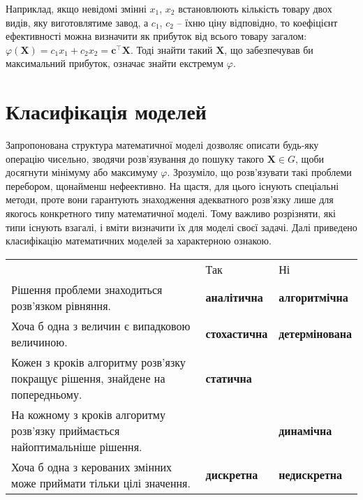 \documentclass[../book.tex]{subfiles}
\begin{document}
Наприклад, якщо невідомі змінні $x_1$, $x_2$ встановлюють кількість товару двох видів, яку виготовлятиме завод, а $c_1$, $c_2$ -- їхню ціну відповідно, то коефіцієнт ефективності можна визначити як прибуток від всього товару загалом: ${\varphi(\mathbf{X})} = {c_1 x_1} + {c_2 x_2} = \mathbf{c}^\top \mathbf{X}$. Тоді знайти такий $\mathbf{X}$, що забезпечував би максимальний прибуток, означає знайти екстремум $\varphi$.

\section{Класифікація моделей}

Запропонована структура математичної моделі дозволяє описати будь-яку операцію чисельно, зводячи розв'язування до пошуку такого ${\mathbf{X} \in G}$, щоби досягнути мінімуму або максимуму $\varphi$. Зрозуміло, що роз\-в'яз\-ува\-ти такі проблеми перебором, щонайменш нефеективно. На щастя, для цього існують спеціальні методи, проте вони гарантують знаходження адекватного розв'язку лише для якогось конкретного типу математичної моделі. Тому важливо розрізняти, які типи існують взагалі, і вміти визначити їх для моделі своєї задачі. Далі приведено класифікацію математичних моделей за характерною ознакою.

\begin{table}[!ht]
\centering
\begin{tabular}{p{5.5cm}|ll}
 & Так & Ні \\
 Рішення проблеми знаходиться розв'язком рівняння. & \textbf{аналітична} & \textbf{алгоритмічна} \\
 Хоча б одна з величин є випадковою величиною. & \textbf{стохастична} & \textbf{детермінована} \\
 Кожен з кроків алгоритму розв'язку покращує рішення, знайдене на попередньому. & \textbf{статична} & \\
 На кожному з кроків алгоритму розв'язку приймається найоптимальніше рішення. & & \textbf{динамічна} \\
 Хоча б одна з керованих змінних може приймати тільки цілі значення. & \textbf{дискретна} & \textbf{недискретна}
\end{tabular}
\end{table}
\end{document}
